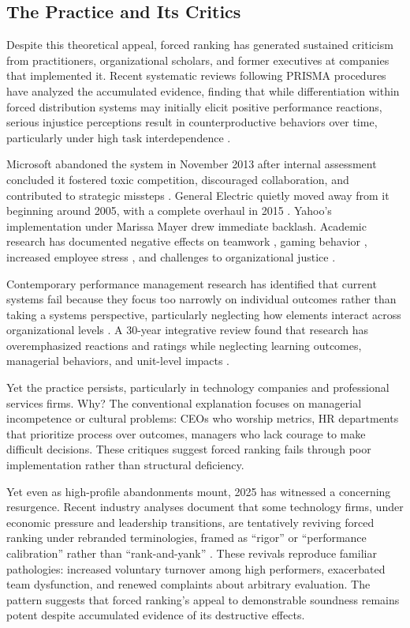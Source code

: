 \documentclass[12pt]{article}
\begin{document}
\subsection{The Practice and Its Critics}

Despite this theoretical appeal, forced ranking has generated sustained criticism from practitioners, organizational scholars, and former executives at companies that implemented it. Recent systematic reviews following PRISMA procedures have analyzed the accumulated evidence, finding that while differentiation within forced distribution systems may initially elicit positive performance reactions, serious injustice perceptions result in counterproductive behaviors over time, particularly under high task interdependence \citep{wijayanti2023systematic}.

Microsoft abandoned the system in November 2013 after internal assessment concluded it fostered toxic competition, discouraged collaboration, and contributed to strategic missteps \citep{eichenwald2012microsoft}. General Electric quietly moved away from it beginning around 2005, with a complete overhaul in 2015 \citep{microsoft2013}. Yahoo's implementation under Marissa Mayer drew immediate backlash. Academic research has documented negative effects on teamwork \citep{pfeffer2001fighting, loberg2021forced}, gaming behavior \citep{scullen2005forced}, increased employee stress \citep{cardinaels2021forced}, and challenges to organizational justice \citep{moon2016precarious}.

Contemporary performance management research has identified that current systems fail because they focus too narrowly on individual outcomes rather than taking a systems perspective, particularly neglecting how elements interact across organizational levels \citep{schleicher2018putting}. A 30-year integrative review found that research has overemphasized reactions and ratings while neglecting learning outcomes, managerial behaviors, and unit-level impacts \citep{schleicher2019evaluating}.

Yet the practice persists, particularly in technology companies and professional services firms. Why? The conventional explanation focuses on managerial incompetence or cultural problems: CEOs who worship metrics, HR departments that prioritize process over outcomes, managers who lack courage to make difficult decisions. These critiques suggest forced ranking fails through poor implementation rather than structural deficiency.

Yet even as high-profile abandonments mount, 2025 has witnessed a concerning resurgence. Recent industry analyses document that some technology firms, under economic pressure and leadership transitions, are tentatively reviving forced ranking under rebranded terminologies, framed as ``rigor'' or ``performance calibration'' rather than ``rank-and-yank'' \citep{kornferry2025revival}. These revivals reproduce familiar pathologies: increased voluntary turnover among high performers, exacerbated team dysfunction, and renewed complaints about arbitrary evaluation. The pattern suggests that forced ranking's appeal to demonstrable soundness remains potent despite accumulated evidence of its destructive effects.
\end{document}

